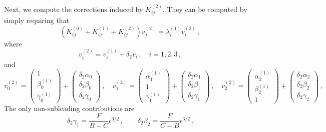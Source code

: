\documentclass[11pt,a4paper]{article}
\begin{document}
%
Next, we compute the corrections induced by $K^{(2)}_{ij}$. They can be computed by simply requiring that
\begin{equation}
\label{eq:EigenvaluesEquation32}
\left(K_{ij}^{(0)} + K_{ij}^{(1)} + K_{ij}^{(2)}\right) v^{(2)}_j = \lambda^{(1)}_i v^{(2)}_i\,,
\end{equation}
where
\begin{equation}
v^{(2)}_i = v_i^{(1)} + \delta_2 v_i \,, \quad i=1,2,3 \,,
\end{equation}
and
\begin{equation}
v_0^{(2)} = \begin{pmatrix} 1 \\ \beta_0^{(1)} \\ \gamma_0^{(1)} \end{pmatrix} + \begin{pmatrix} \delta_2 \alpha_0 \\ \delta_2 \beta_0 \\ \delta_2 \gamma_0 \end{pmatrix} \,, \quad v_1^{(2)} = \begin{pmatrix} \alpha_1^{(1)} \\ 1 \\ \gamma_1^{(1)} \end{pmatrix} + \begin{pmatrix} \delta_2 \alpha_1 \\ \delta_2 \beta_1 \\ \delta_2 \gamma_1 \end{pmatrix} \,, \quad v_2^{(2)} = \begin{pmatrix} \alpha_2^{(1)} \\ \beta_2^{(1)} \\ 1 \end{pmatrix} + \begin{pmatrix} \delta_2 \alpha_2 \\ \delta_2 \beta_2 \\ \delta_2 \gamma_2 \end{pmatrix} \,,
\end{equation}
%
The only non-subleading contributions are
\begin{equation}
\delta_2 \gamma_1 = \frac{F}{B-C} \epsilon^{3/2} \,, \qquad \delta_2 \beta_2 = \frac{F}{C-B} \epsilon^{3/2} \,.
\end{equation}
\end{document}
